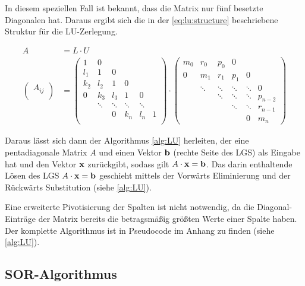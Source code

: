 In diesem speziellen Fall ist bekannt, dass die Matrix nur fünf besetzte Diagonalen hat. Daraus ergibt sich die in der \autoref{eq:lu:structure} beschriebene Struktur für die LU-Zerlegung.

\begin{align}
A &= L \cdot U \\
\label{eq:lu:structure}
\begin{pmatrix}
A_{ij}\\
\end{pmatrix}
&= 
\begin{pmatrix}
1 & 0 &  \\
l_1 & 1 & 0 &\\
k_2 & l_2 & 1 & 0 &\\
0 & k_3 & l_3 & 1 & 0 &\\
  &   \ddots  & \ddots & \ddots & \ddots\\
  & & 0& k_n & l_n & 1\\
\end{pmatrix}
\cdot
\begin{pmatrix}
m_0 & r_0 & p_0 & 0 &  \\
0 & m_1 & r_1 & p_1 & 0 &  \\
 & \ddots& \ddots & \ddots & \ddots & 0\\
 & & \ddots&\ddots&\ddots & p_{n-2}\\
 & & &\ddots&\ddots & r_{n-1}\\
&&  & &0& m_n 
\end{pmatrix}
\end{align}

Daraus lässt sich dann der Algorithmus \autoref{alg:LU} herleiten, der eine pentadiagonale Matrix $A$ und einen Vektor $\mathbf b$ (rechte Seite des LGS) als Eingabe hat und den Vektor $\mathbf x$ zurückgibt, sodass gilt $A \cdot \mathbf x = \mathbf b$. Das darin enthaltende Lösen des LGS $A\cdot \mathbf x = \mathbf b$ geschieht mittels der Vorwärts Eliminierung und der Rückwärts Substitution (siehe \autoref{alg:LU}). 

Eine erweiterte Pivotisierung der Spalten ist nicht notwendig, da die Diagonal-Einträge der Matrix bereits die betragsmäßig größten Werte einer Spalte haben. Der komplette Algorithmus ist in Pseudocode im Anhang zu finden (siehe \ref{alg:LU}).



\subsection{SOR-Algorithmus}
\label{sec:maths:sor}

